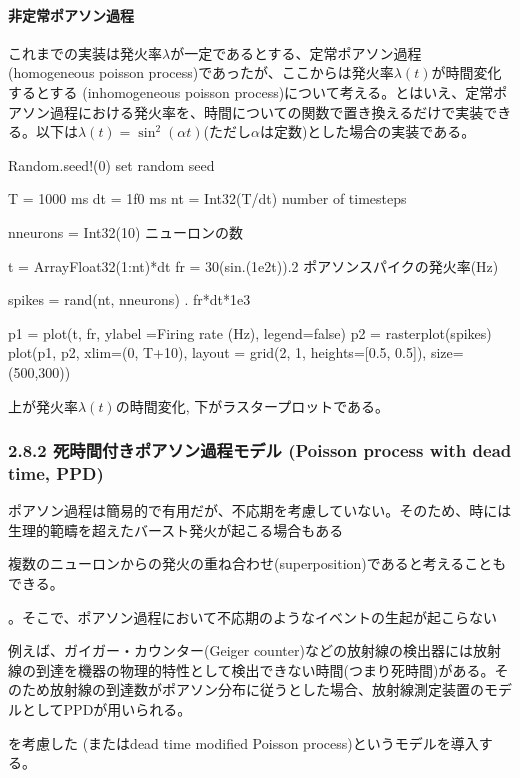 \documentclass[letterpaper,10pt,english]{sphinxmanual}
\begin{document}
\paragraph{非定常ポアソン過程}
\label{\detokenize{2-8_isi:id4}}
これまでの実装は発火率\(\lambda\)が一定であるとする、定常ポアソン過程 (homogeneous poisson process)であったが、ここからは発火率\(\lambda(t)\)が時間変化するとする (inhomogeneous poisson process)について考える。とはいえ、定常ポアソン過程における発火率を、時間についての関数で置き換えるだけで実装できる。以下は\(\lambda(t)=\sin^2(\alpha t)\)(ただし\(\alpha\)は定数)とした場合の実装である。

\begin{sphinxVerbatim}[commandchars=\\\{\}]
Random.seed!(0) \PYGZsh{} set random seed

T = 1000 \PYGZsh{} ms
dt = 1f0 \PYGZsh{} ms
nt = Int32(T/dt) \PYGZsh{} number of timesteps

n\PYGZus{}neurons = Int32(10) \PYGZsh{} ニューロンの数

t = Array\PYGZob{}Float32\PYGZcb{}(1:nt)*dt
fr = 30(sin.(1e\PYGZhy{}2t)).\PYGZca{}2 \PYGZsh{} ポアソンスパイクの発火率(Hz)

spikes = rand(nt, n\PYGZus{}neurons) .\PYGZlt{} fr*dt*1e\PYGZhy{}3

p1 = plot(t, fr, ylabel =\PYGZdq{}Firing rate (Hz)\PYGZdq{}, legend=false)
p2 = rasterplot(spikes)
plot(p1, p2, xlim=(0, T+10), layout = grid(2, 1, heights=[0.5, 0.5]), size=(500,300))
\end{sphinxVerbatim}

上が発火率\(\lambda(t)\)の時間変化, 下がラスタープロットである。


\subsubsection{2.8.2 死時間付きポアソン過程モデル (Poisson process with dead time, PPD)}
\label{\detokenize{2-8_isi:poisson-process-with-dead-time-ppd}}
ポアソン過程は簡易的で有用だが、不応期を考慮していない。そのため、時には生理的範疇を超えたバースト発火が起こる場合もある%
\begin{footnote}[1]\sphinxAtStartFootnote
複数のニューロンからの発火の重ね合わせ(superposition)であると考えることもできる。
%
\end{footnote}。そこで、ポアソン過程において不応期のようなイベントの生起が起こらない  %
\begin{footnote}[2]\sphinxAtStartFootnote
例えば、ガイガー・カウンター(Geiger counter)などの放射線の検出器には放射線の到達を機器の物理的特性として検出できない時間(つまり死時間)がある。そのため放射線の到達数がポアソン分布に従うとした場合、放射線測定装置のモデルとしてPPDが用いられる。
%
\end{footnote}を考慮した (またはdead time modified Poisson process)というモデルを導入する。
\end{document}
